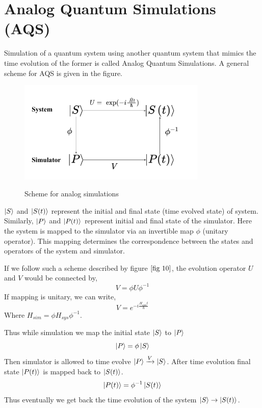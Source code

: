 \documentclass[12pt,a4paper]{report}
\begin{document}
\section{Analog Quantum Simulations (AQS)}
Simulation of a quantum system using another quantum system that mimics the time evolution of the former is called Analog Quantum Simulations. A general scheme for AQS is given in the figure.\par
\begin{figure}[h]
\graphicspath{ {./Images/} }	
{\includegraphics[width=0.8\textwidth]{fig_10.png}}
\centering
\caption{Scheme for analog simulations}
\label{fig 10}
\end{figure}
$\ket{S}$ and $\ket{S(t)}$ represent the initial and final state (time evolved state) of system. Similarly, $\ket{P}$ and $\ket{P(t)}$ represent initial and final state of the simulator. 
Here the system is mapped to the simulator via an invertible map $\phi$ (unitary operator). This mapping determines the correspondence between the states and operators of the system and simulator.\par
If we follow such a scheme described by figure $\ref{fig 10}$, the evolution operator $U$ and $ V$ would be connected by,
\begin{equation}
V = \phi U \phi^{-1}
\end{equation}
If mapping is unitary, we can write,
\begin{equation}
V = e^{- i\frac{H_{sim} t}{\hbar}}
\end{equation}
Where $H_{sim} = \phi H_{sys} \phi^{-1}$.\par
Thus while simulation we map the initial state $\ket{S}$ to $\ket{P}$
\begin{equation}
\ket{P} = \phi \ket{S} 
\end{equation}
Then simulator is allowed to time evolve $\ket{P} \xrightarrow{V} \ket{S}$. After time evolution final state $\ket{P(t)}$ is mapped back to $\ket{S(t)}$.
\begin{equation}
\ket{P(t)} = \phi^{-1}\ket{S(t)}
\end{equation}
Thus eventually we get back the time evolution of the system $\ket{S} \rightarrow \ket{S(t)}$.
\end{document}
